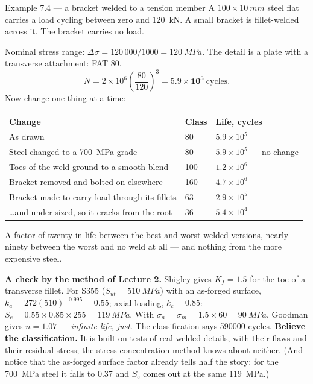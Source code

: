 \documentclass[11pt,a4paper]{article}
\begin{document}
\begin{examplebox}{Example 7.4 --- a bracket welded to a tension member}
A $100\times\SI{10}{mm}$ steel flat carries a load cycling between zero and \SI{120}{kN}. A small
bracket is fillet-welded across it. The bracket carries no load.

\medskip
Nominal stress range: $\Delta\sigma=120\,000/1000=\SI{120}{MPa}$. The detail is a plate with a
transverse attachment: FAT 80.
\[ N=2\times10^{6}\left(\frac{80}{120}\right)^{3}=\mathbf{5.9\times10^{5}}\ \text{cycles.} \]
Now change one thing at a time:

\begin{center}\small
\begin{tabular}{@{}lll@{}}
\toprule
Change & Class & Life, cycles\\
\midrule
As drawn & 80 & $5.9\times10^{5}$\\
Steel changed to a \SI{700}{MPa} grade & 80 & $5.9\times10^{5}$ --- no change\\
Toes of the weld ground to a smooth blend & 100 & $1.2\times10^{6}$\\
Bracket removed and bolted on elsewhere & 160 & $4.7\times10^{6}$\\
Bracket made to carry load through its fillets & 63 & $2.9\times10^{5}$\\
\ldots and under-sized, so it cracks from the root & 36 & $5.4\times10^{4}$\\
\bottomrule
\end{tabular}
\end{center}

A factor of twenty in life between the best and worst welded versions, nearly ninety between the worst
and no weld at all --- and nothing from the more expensive steel.

\medskip
\textbf{A check by the method of Lecture 2.} Shigley gives $K_f=1.5$ for the toe of a transverse
fillet. For S355 ($S_{ut}=\SI{510}{MPa}$) with an as-forged surface, $k_a=272(510)^{-0.995}=0.55$;
axial loading, $k_c=0.85$: $S_e=0.55\times0.85\times255=\SI{119}{MPa}$. With
$\sigma_a=\sigma_m=1.5\times60=\SI{90}{MPa}$, Goodman gives $n=1.07$ --- \emph{infinite life,
just}. The classification says \num{590000} cycles. \textbf{Believe the classification.} It is
built on tests of real welded details, with their flaws and their residual stress; the
stress-concentration method knows about neither. (And notice that the as-forged surface factor
already tells half the story: for the \SI{700}{MPa} steel it falls to 0.37 and $S_e$ comes out at
the same \SI{119}{MPa}.)
\end{examplebox}
\end{document}
